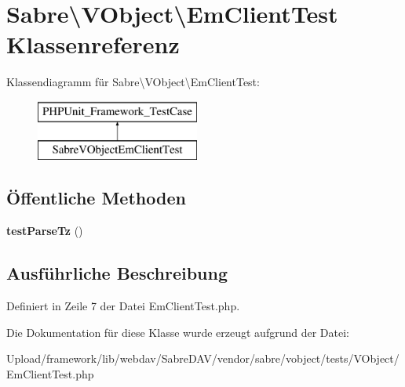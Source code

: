 \hypertarget{class_sabre_1_1_v_object_1_1_em_client_test}{}\section{Sabre\textbackslash{}V\+Object\textbackslash{}Em\+Client\+Test Klassenreferenz}
\label{class_sabre_1_1_v_object_1_1_em_client_test}
Klassendiagramm für Sabre\textbackslash{}V\+Object\textbackslash{}Em\+Client\+Test\+:\begin{figure}[H]
\begin{center}
\leavevmode
\includegraphics[height=2.000000cm]{class_sabre_1_1_v_object_1_1_em_client_test}
\end{center}
\end{figure}
\subsection*{Öffentliche Methoden}
\begin{DoxyCompactItemize}
\item 
\mbox{\label{class_sabre_1_1_v_object_1_1_em_client_test_a3f6354fcd580ca01aab9b9ad693d28c2}} 
{\bfseries test\+Parse\+Tz} ()
\end{DoxyCompactItemize}


\subsection{Ausführliche Beschreibung}


Definiert in Zeile 7 der Datei Em\+Client\+Test.\+php.



Die Dokumentation für diese Klasse wurde erzeugt aufgrund der Datei\+:\begin{DoxyCompactItemize}
\item 
Upload/framework/lib/webdav/\+Sabre\+D\+A\+V/vendor/sabre/vobject/tests/\+V\+Object/Em\+Client\+Test.\+php\end{DoxyCompactItemize}
